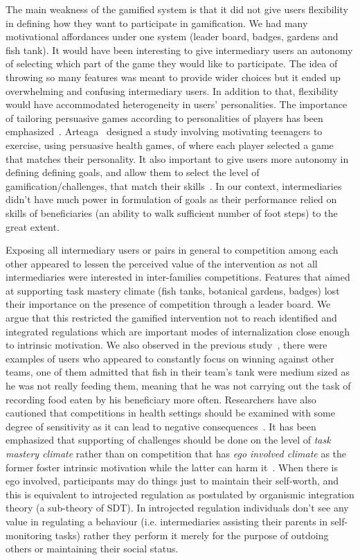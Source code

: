\documentclass{sig-alternate}
\begin{document}
The main weakness of the gamified system is that it did not give users flexibility in defining how they want to participate in gamification. We had many motivational affordances under one system (leader board, badges, gardens and fish tank). It would have been interesting to give intermediary users an autonomy of selecting which part of the game they would like to participate. The idea of throwing so many features was meant to provide wider choices but it ended up overwhelming and confusing intermediary users. In addition to that, flexibility would have accommodated heterogeneity in users' personalities. The importance of tailoring persuasive games according to personalities of players has been emphasized~\cite{orji2013:tailoring}. Arteaga~\cite{arteaga2010:persuasive} designed a study involving motivating teenagers to exercise, using persuasive health games, of where each player selected a game that matches their personality. It also important to give users more autonomy in defining defining goals, and allow them to select the level of gamification/challenges, that match their skills~\cite{zhang2008:motivational}. In our context, intermediaries didn't have much power in formulation of goals as their performance relied on skills of beneficiaries (an ability to walk sufficient number of foot steps) to the great extent. 

Exposing all intermediary users or pairs in general to competition among each other appeared to lessen the perceived value of the intervention as not all intermediaries were interested in inter-families competitions. Features that aimed at supporting task mastery climate (fish tanks, botanical gardens, badges) lost their importance on the presence of competition through a leader board. We argue that this restricted the gamified intervention not to reach identified and integrated regulations which are important modes of internalization close enough to intrinsic motivation. We also observed in the previous study~\cite{katule2016:leveraging},  there were examples of users who appeared to constantly focus on winning against other teams, one of them admitted that fish in their team's tank were medium sized as he was not really feeding them, meaning that he was not carrying out the task of recording food eaten by his beneficiary more often. Researchers have also cautioned that competitions in health settings should be examined with some degree of sensitivity as it can lead to negative consequences~\cite{grimes2009toward}. It has been emphasized that supporting of  challenges should be done on the level of \emph{task mastery climate} rather than on competition that has \emph{ego involved climate} as the  former foster intrinsic motivation while the latter can harm it~\cite{saksono2015spaceship}. When there is ego involved, participants may do things just to maintain their self-worth, and this is equivalent to introjected regulation as postulated by organismic integration theory (a sub-theory of SDT)\cite{ryan2000:self}. In introjected regulation individuals don't see any value in regulating a behaviour (i.e. intermediaries assisting their parents in self-monitoring tasks) rather they perform it merely for the purpose of outdoing others or maintaining their social status. 
\end{document}
